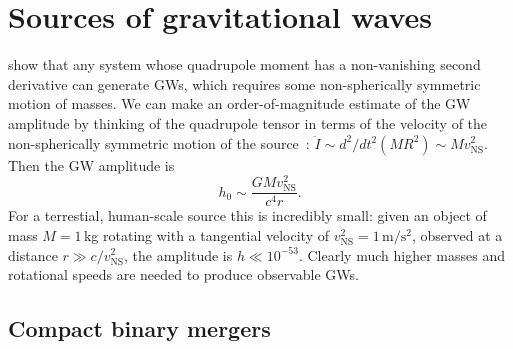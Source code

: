 \section{Sources of gravitational waves}\label{sec:gw-sources}

 show that any system whose quadrupole moment has a non-vanishing second derivative can generate \acp{GW}, which requires some non-spherically symmetric motion of masses.
We can make an order-of-magnitude estimate of the GW amplitude by thinking of the quadrupole tensor in terms of the velocity of the non-spherically symmetric motion of the source~\citep{Misner_1973}: $\ddot{I} \sim d^2/dt^2 (M R^2) \sim M v_{\textrm{NS}}^2$.
Then the GW amplitude is
\begin{equation}
	h_0 \sim \frac{GM v_{\textrm{NS}}^2}{c^4 r}.
\end{equation}
For a terrestial, human-scale source this is incredibly small: given an object of mass $M=1$\,kg rotating with a tangential velocity of $v_{\textrm{NS}}^2=1\,\mathrm{m/s^2}$, observed at a distance $r \gg c/v_{\textrm{NS}}^2$, the amplitude is $h \ll 10^{-53}$.
Clearly much higher masses and rotational speeds are needed to produce observable GWs.


\subsection{Compact binary mergers}

